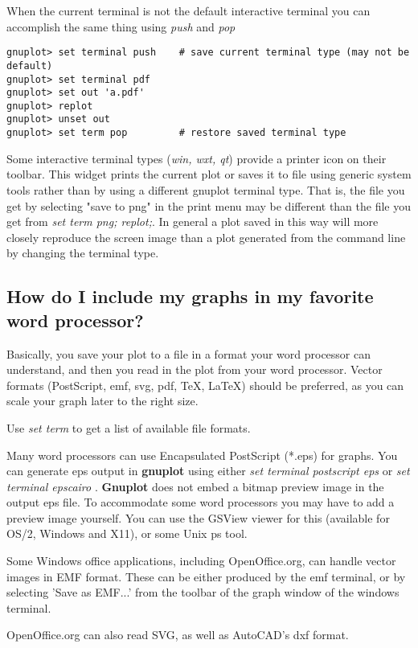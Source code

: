 \documentclass[a4paper,11pt]{article}
\newcommand{\gnuplot}{\textbf{gnuplot }}
\newcommand{\Gnuplot}{\textbf{Gnuplot }}
\begin{document}
When the current terminal is not the default interactive terminal you
can accomplish the same thing using {\em push} and {\em pop}
\small
\begin{verbatim}
gnuplot> set terminal push    # save current terminal type (may not be default)
gnuplot> set terminal pdf
gnuplot> set out 'a.pdf'
gnuplot> replot
gnuplot> unset out
gnuplot> set term pop         # restore saved terminal type
\end{verbatim}
\normalsize

Some interactive terminal types (\textit{win, wxt, qt}) provide a printer icon
on their toolbar. This widget prints the current plot or saves it to file
using generic system tools rather than by using a different gnuplot terminal type.
That is, the file you get by selecting "save to png" in the print menu may be
different than the file you get from \textit{set term png; replot;}.
In general a plot saved in this way will more closely reproduce the screen image than
a plot generated from the command line by changing the terminal type.


\subsection{How do I include my graphs in my favorite word processor?}

Basically, you save your plot to a file in a format your word processor
can understand, and then you read in the plot from your word processor. Vector
formats (PostScript, emf, svg, pdf, \TeX{}, \LaTeX{}) should be preferred,
as you can scale your graph later to the right size.

Use {\em set term} to get a list of available file formats.

Many word processors can use Encapsulated PostScript (*.eps) for graphs. 
You can generate eps output in \gnuplot using either
{\em set terminal postscript eps}
or
{\em set terminal epscairo}
.
\Gnuplot does not embed a bitmap preview image in the output eps file.
To accommodate some word processors you may have to add a preview image yourself.
You can use the GSView viewer for this (available for OS/2, Windows and X11),
or some Unix ps tool.

Some Windows office applications, including OpenOffice.org, can handle
vector images in EMF format. These can be either produced by the emf 
terminal, or by selecting 'Save as EMF...' from the toolbar of the graph
window of the windows terminal.

OpenOffice.org can also read SVG, as well as AutoCAD's dxf format.
\end{document}
